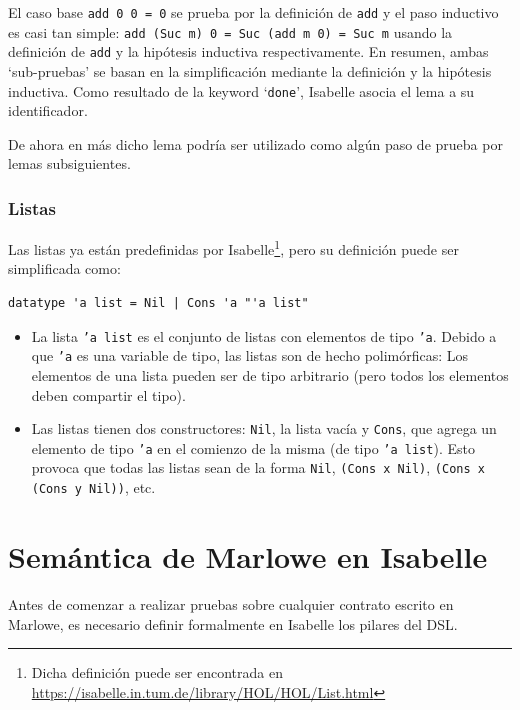 \documentclass[12pt]{book}
\begin{document}
El caso base \texttt{add 0 0 = 0} se prueba por la definición de \texttt{add} y el paso inductivo es casi tan simple: \texttt{add (Suc m) 0 = Suc (add m 0) = Suc m} usando la definición de \texttt{add} y la hipótesis inductiva respectivamente. En resumen, ambas `sub-pruebas' se basan en la simplificación mediante la definición y la hipótesis inductiva. Como resultado de la keyword `\texttt{done}', Isabelle asocia el lema a su identificador.

De ahora en más dicho lema podría ser utilizado como algún paso de prueba por lemas subsiguientes.

\subsubsection{Listas}

Las listas ya están predefinidas por Isabelle\footnote{Dicha definición puede ser encontrada en \url{https://isabelle.in.tum.de/library/HOL/HOL/List.html}}, pero su definición puede ser simplificada como:

\begin{lstlisting}[style=Isabelle]
datatype 'a list = Nil | Cons 'a "'a list"
\end{lstlisting}

\begin{itemize}
	\item La lista \texttt{'a list} es el conjunto de listas con elementos de tipo \texttt{'a}. Debido a que \texttt{'a} es una variable de tipo, las listas son de hecho polimórficas: Los elementos de una lista pueden ser de tipo arbitrario (pero todos los elementos deben compartir el tipo).

	\item Las listas tienen dos constructores: \texttt{Nil}, la lista vacía y \texttt{Cons}, que agrega un elemento de tipo \texttt{'a} en el comienzo de la misma (de tipo \texttt{'a list}). Esto provoca que todas las listas sean de la forma \texttt{Nil}, \texttt{(Cons x Nil)}, \texttt{(Cons x (Cons y Nil))}, etc.
\end{itemize}

\section{Semántica de Marlowe en Isabelle}

Antes de comenzar a realizar pruebas sobre cualquier contrato escrito en Marlowe, es necesario definir formalmente en Isabelle los pilares del DSL.\@
\end{document}

